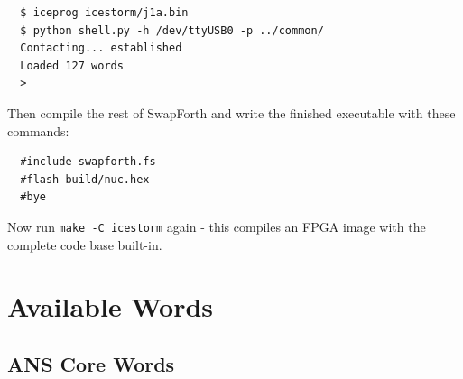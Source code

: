 \documentclass[10pt]{book}
\newcommand{\mach}[1]{\texttt{#1}}
\newcommand{\word}[1]{
\texttt{\textbf{#1}}
}
\begin{document}
\begin{framed}
\begin{Verbatim}
  $ iceprog icestorm/j1a.bin
  $ python shell.py -h /dev/ttyUSB0 -p ../common/
  Contacting... established
  Loaded 127 words
  >
\end{Verbatim}
\end{framed}

Then compile the rest of SwapForth and write the finished executable with these commands:

\begin{framed}
\begin{Verbatim}
  #include swapforth.fs
  #flash build/nuc.hex
  #bye
\end{Verbatim}
\end{framed}

Now run \mach{make -C icestorm} again - this compiles an FPGA image with the complete code base built-in.


\newcommand{\worddef}[3]{
\vspace{1pt}
\noindent \word{#1} \mach{#2} #3
\\
}

\newcommand{\longworddef}[3]{
\begin{samepage}
\vspace{1pt}

\noindent \word{#1}
\index{#1@\mach{#1}}

\vspace{4pt}

\mach{#2}

\vspace{4pt}

\setlength{\parindent}{0cm}

#3

\end{samepage}

\noindent
\textcolor{lightgray}{\rule{\textwidth}{1pt}}
}

\chapter{Available Words}

\section{ANS Core Words} 
\end{document}
